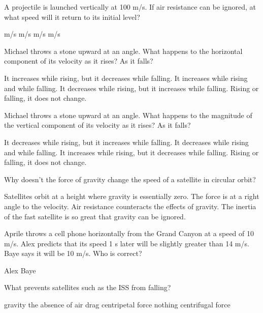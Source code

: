\documentclass{exam}
\begin{document}
\begin{questions}
\newpage{}

\question  A projectile is launched vertically at 100 m/s. If air resistance can be ignored, at what speed will it return to its initial level? 
\begin{choices}
   m/s 
   m/s 
   m/s 
   m/s 
\end{choices}
\vfill{}

\question Michael throws a stone upward at an angle. What happens to the horizontal component of its velocity as it rises? As it falls? 
\begin{choices}
  \choice It increases while rising, but it decreases while falling. 
  \choice It increases while rising and while falling. 
  \choice It decreases while rising, but it increases while falling. 
  \choice Rising or falling, it does not change. 
\end{choices}
\vfill{}

\question Michael throws a stone upward at an angle. What happens to the magnitude of the vertical component of its velocity as it rises? As it falls? 
\begin{choices}
  \choice It decreases while rising, but it increases while falling. 
  \choice It decreases while rising and while falling. 
  \choice It increases while rising, but it decreases while falling. 
  \choice Rising or falling, it does not change. 
\end{choices}
\vfill{}

\question Why doesn't the force of gravity change the speed of a satellite in circular orbit? 
\begin{choices}
  \choice Satellites orbit at a height where gravity is essentially zero. 
  \choice The force is at a right angle to the velocity. 
  \choice Air resistance counteracts the effects of gravity. 
  \choice The inertia of the fast satellite is so great that gravity can be ignored. 
\end{choices}
\vfill{}

\question Aprile throws a cell phone horizontally from the Grand Canyon at a speed of 10 m/s. Alex predicts that its speed 1 s later will be slightly greater than 14 m/s. Baye says it will be 10 m/s. Who is correct?
\begin{choices}
  \choice Alex
  \choice Baye
\end{choices}
\vfill{}

\question What prevents satellites such as the ISS from falling?
\begin{choices}
  \choice gravity
  \choice the absence of air drag
  \choice centripetal force
  \choice nothing
  \choice centrifugal force
\end{choices}
\vfill{}

\end{questions}
\end{document}
